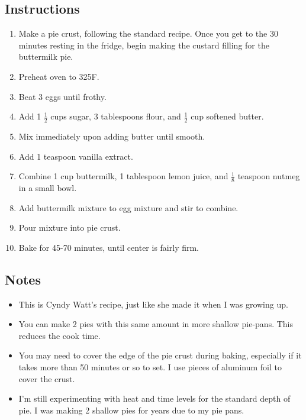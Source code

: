 \begin{multicols}{2}
\subsection*{Instructions}
\begin{enumerate}
    \item Make a pie crust, following the standard recipe. Once you get to the 30 minutes resting in the fridge, begin making the custard filling for the buttermilk pie.
    \item Preheat oven to 325F.
    \item Beat 3 eggs until frothy.
    \item Add 1 \( \frac{1}{2} \) cups sugar, 3 tablespoons flour, and \( \frac{1}{2} \) cup softened butter.
    \item Mix immediately upon adding butter until smooth.
    \item Add 1 teaspoon vanilla extract.
    \item Combine 1 cup buttermilk, 1 tablespoon lemon juice, and \( \frac{1}{8} \) teaspoon nutmeg in a small bowl.
    \item Add buttermilk mixture to egg mixture and stir to combine.
    \item Pour mixture into pie crust.
    \item Bake for 45-70 minutes, until center is fairly firm.

\end{enumerate}

\subsection*{Notes}
\begin{itemize}
    \item This is Cyndy Watt’s recipe, just like she made it when I was growing up.
    \item You can make 2 pies with this same amount in more shallow pie-pans. This reduces the cook time.
    \item You may need to cover the edge of the pie crust during baking, especially if it takes more than 50 minutes or so to set. I use pieces of aluminum foil to cover the crust.
    \item I’m still experimenting with heat and time levels for the standard depth of pie. I was making 2 shallow pies for years due to my pie pans.

\end{itemize}
\end{multicols}
\clearpage